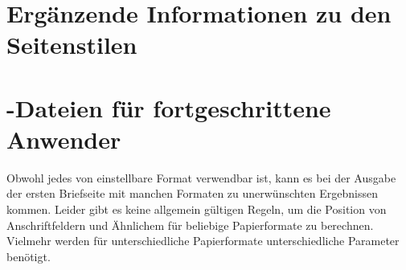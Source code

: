 \section{Ergänzende Informationen zu den Seitenstilen}
\BeginIndexGroup
{}

%
\EndIndexGroup

\iffalse%
\section{Unterschiede in der Behandlung von \File{lco}-Dateien bei
  \Package{scrletter}}
\seclabel{lcoatscrletter}
\BeginIndexGroup
\BeginIndex{File}{lco}
\BeginIndex{}{lco-Datei=\File{lco}-Datei}

In\ChangedAt{v3.15}{\Package{scrletter}} \autoref{sec:scrlttr2.lcoFile} wurde
erklärt, dass man \File{lco}-Dateien direkt über \Macro{documentclass} laden
kann. Für \Package{scrletter}\OnlyAt{\Package{scrlttr2}} wurde auf diese
Möglichkeit verzichtet.

\begin{Declaration}
  \Macro{LoadLetterOption}\Parameter{Name}
  \Macro{LoadLetterOptions}\Parameter{Liste von Namen}
\end{Declaration}
Während für \Class{scrlttr2} lediglich empfohlen wird, \File{lco}-Dateien über
\DescRef{scrlttr2.cmd.LoadLetterOption} oder
\DescRef{scrlttr2.cmd.LoadLetterOptions} zu laden, ist dies für
\Package{scrletter} zwingend. Natürlich können die \File{lco}-Dateien auch
erst nach \Package{scrletter} geladen werden.
%
\EndIndexGroup
%
\EndIndexGroup
%
\fi


\section{-Dateien für fortgeschrittene Anwender}
\BeginIndexGroup
{}

\BeginIndexGroup%
%
Obwohl jedes von \hyperref[cha:typearea]{}%
 einstellbare Format verwendbar ist, kann es bei der
Ausgabe der ersten Briefseite mit manchen Formaten zu unerwünschten
Ergebnissen kommen. Leider gibt es
keine allgemein gültigen Regeln, um die Position von Anschriftfeldern und
Ähnlichem für beliebige Papierformate zu berechnen. Vielmehr werden für
unterschiedliche Papierformate unterschiedliche Parameter benötigt.%

